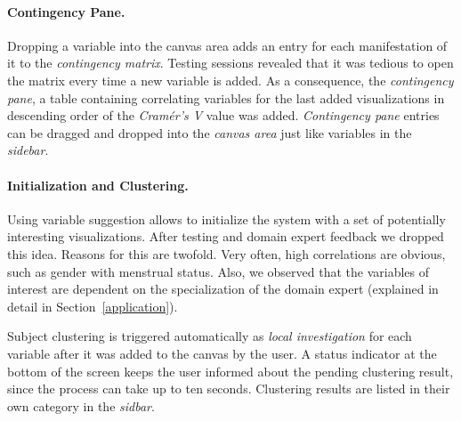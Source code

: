 \documentclass[journal]{style/vgtc} 			          %
\newcommand{\com}[1]{\textcolor{orange}{\uline{#1}}}
\begin{document}
\paragraph{Contingency Pane.}
Dropping a variable into the canvas area adds an entry for each manifestation of it to the \emph{contingency matrix}.
%
Testing sessions revealed that it was tedious to open the matrix every time a new variable is added. 
%
As a consequence, the \emph{contingency pane}, a table containing correlating variables for the last added visualizations in descending order of the \emph{Cram\'{e}r's V} value was added.
%
\emph{Contingency pane} entries can be dragged and dropped into the \emph{canvas area} just like variables in the \emph{sidebar}.
%
\paragraph{Initialization and Clustering.}
Using variable suggestion allows to initialize the system with a set of potentially interesting visualizations.
%
After testing and domain expert feedback we dropped this idea.
%
Reasons for this are twofold.
%
Very often, high correlations are obvious, such as gender with menstrual status.
%
Also, we observed that the variables of interest are dependent on the specialization of the domain expert (explained in detail in Section~\ref{application}).

Subject clustering is triggered automatically as \emph{local investigation} for each variable after it was added to the canvas by the user.
%
A status indicator at the bottom of the screen keeps the user informed about the pending clustering result, since the process can take up to ten seconds.
%
Clustering results are listed in their own category in the \emph{sidbar}.
%
\end{document}
